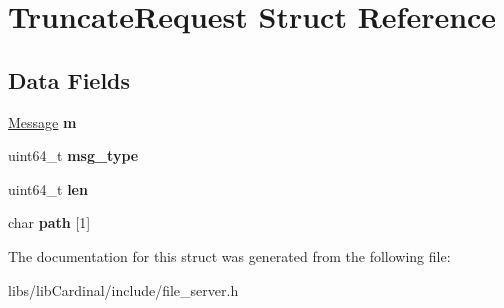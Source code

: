 \hypertarget{structTruncateRequest}{}\section{Truncate\+Request Struct Reference}
\label{structTruncateRequest}
\subsection*{Data Fields}
\begin{DoxyCompactItemize}
\item 
\hyperlink{structMessage}{Message} {\bfseries m}\hypertarget{structTruncateRequest_a8f5ed15a38d7c3b5571a6b2c2dfd552b}{}\label{structTruncateRequest_a8f5ed15a38d7c3b5571a6b2c2dfd552b}

\item 
uint64\+\_\+t {\bfseries msg\+\_\+type}\hypertarget{structTruncateRequest_a44f6424ba218df8ba2e5d24fc20b53b1}{}\label{structTruncateRequest_a44f6424ba218df8ba2e5d24fc20b53b1}

\item 
uint64\+\_\+t {\bfseries len}\hypertarget{structTruncateRequest_a3aef26d2b5d23ed07c6f8e2f372e0775}{}\label{structTruncateRequest_a3aef26d2b5d23ed07c6f8e2f372e0775}

\item 
char {\bfseries path} \mbox{[}1\mbox{]}\hypertarget{structTruncateRequest_a80de4619e6b2af381048680aa388a8d2}{}\label{structTruncateRequest_a80de4619e6b2af381048680aa388a8d2}

\end{DoxyCompactItemize}


The documentation for this struct was generated from the following file\+:\begin{DoxyCompactItemize}
\item 
libs/lib\+Cardinal/include/file\+\_\+server.\+h\end{DoxyCompactItemize}
